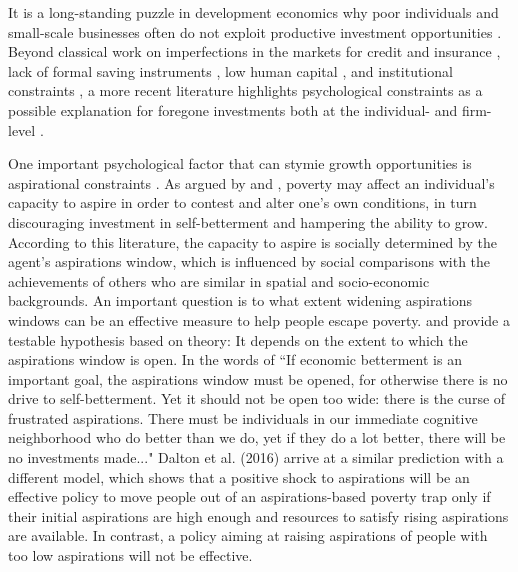 \documentclass[11.5pt]{article}
\begin{document}
It is a long-standing puzzle in development economics why poor individuals and small-scale businesses often do not exploit productive investment opportunities \citep[see,][]{Banerjee2014, deMel2008, McKenzie2008, Karlan2010}. Beyond classical work on imperfections in the markets for credit and insurance \citep[e.g.,][]{Banerjee2015a, Banerjee2018}, lack of formal saving instruments \citep[e.g.,][]{Dupas2013, Dupas2013a}, low human capital \citep[e.g.,][]{Anderson2018, McKenzie2014}, and institutional constraints \citep[e.g.,][]{Bardhan1997}, a more recent literature highlights psychological constraints as a possible explanation for foregone investments both at the individual- and firm-level \citep[see, e.g.,][]{Duflo2012, Bernheim2015, Banerjee2008, Ashraf2006, Bertrand2004}.

One important psychological factor that can stymie growth opportunities is aspirational constraints \citep{Ray2006, Genicot2017, Dalton2016, Bogliacino2014, Lybbert2018}. As argued by \citet{Appadurai2004} and \citet{Ray2006}, poverty may affect an individual's capacity to aspire in order to contest and alter one's own conditions, in turn discouraging investment in self-betterment and hampering the ability to grow. According to this literature, the capacity to aspire is socially determined by the agent's aspirations window, which is influenced by social comparisons with the achievements of others who are similar in spatial and socio-economic backgrounds. An important question is to what extent widening aspirations windows can be an effective measure to help people escape poverty. \citet{Ray2006} and \citet{Genicot2017} provide a testable hypothesis based on theory: It depends on the extent to which the aspirations window is open. In the words of \citet[][p.4]{Ray2003} ``If economic betterment is an important goal, the aspirations window must be opened, for otherwise there is no drive to self-betterment. Yet it should not be open too wide: there is the curse of frustrated aspirations. There must be individuals in our immediate cognitive neighborhood who do better than we do, yet if they do a lot better, there will be no investments made..."  Dalton et al. (2016) arrive at a similar prediction with a different model, which shows that a positive shock to aspirations will be an effective policy to move people out of an aspirations-based poverty trap only if their initial aspirations are high enough and resources to satisfy rising aspirations are available. In contrast, a policy aiming at raising aspirations of people with too low aspirations will not be effective.
\end{document}
